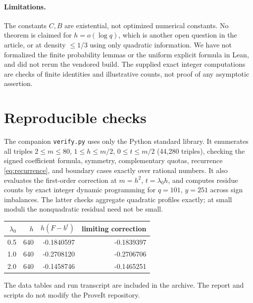 \documentclass[11pt]{article}
\theoremstyle{remark}\newtheorem{remark}[theorem]{Remark}
\begin{document}
\paragraph{Limitations.} The constants $C,B$ are existential, not optimized numerical constants. No theorem is claimed for $h=o(\log q)$, which is another open question in the article, or at density $\le1/3$ using only quadratic information. We have not formalized the finite probability lemmas or the uniform explicit formula in Lean, and did not rerun the vendored build. The supplied exact integer computations are checks of finite identities and illustrative counts, not proof of any asymptotic assertion.

\section{Reproducible checks}
The companion \texttt{verify.py} uses only the Python standard library. It enumerates all triples $2\le m\le80$, $1\le h\le m/2$, $0\le t\le m/2$ (44,280 triples), checking the signed coefficient formula, symmetry, complementary quotas, recurrence \eqref{eq:recurrence}, and boundary cases exactly over rational numbers. It also evaluates the first-order correction at $m=h^2$, $t=\lambda_0 h$, and computes residue counts by exact integer dynamic programming for $q=101$, $y=251$ across sign imbalances. The latter checks aggregate quadratic profiles exactly; at small moduli the nonquadratic residual need not be small.

\begin{center}
\begin{tabular}{rrrr}
\toprule
$\lambda_0$ & $h$ & $h(F-b^t)$ & limiting correction\\
\midrule
0.5 & 640 & -0.1840597 & -0.1839397 \\
1.0 & 640 & -0.2708120 & -0.2706706 \\
2.0 & 640 & -0.1458746 & -0.1465251 \\
\bottomrule
\end{tabular}
\end{center}
The data tables and run transcript are included in the archive. The report and scripts do not modify the ProveIt repository.
\end{document}
